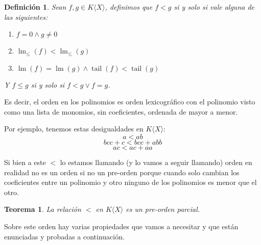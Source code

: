 \documentclass{report}
\theoremstyle{customstyle}
\newtheorem{definition}{Definición}[chapter]
\newtheorem{theorem}{Teorema}[chapter]
\theoremstyle{factstyle}
\DeclareMathOperator{\lm}{lm}
\DeclareMathOperator{\tail}{tail}
\begin{document}
\begin{definition}
  Sean $f, g ∈  K⟨X⟩$, definimos que $f < g$ si y solo si vale alguna de las siguientes:
  \begin{enumerate}
    \item $f = 0 ∧ g ≠ 0$
    \item $\lm_≤(f) < \lm_≤(g)$
    \item $\lm(f) = \lm(g) ∧ \tail(f) < \tail(g)$
  \end{enumerate}
  Y $f ≤ g$ si y solo si $f < g ∨ f = g$.
\end{definition}

Es decir, el orden en los polinomios es orden lexicográfico con el polinomio visto como una lista de monomios, sin coeficientes, ordenada de mayor a menor.

Por ejemplo, tenemos estas desigualdades en $K⟨X⟩$:
\[ a < ab \]
\[ bcc + c < bcc + abb \]
\[ ac < ac + aa \]

Si bien a este $<$ lo estamos llamando (y lo vamos a seguir llamando) orden en realidad no es un orden si no un pre-orden porque cuando solo cambian los coeficientes entre un polinomio y otro ninguno de los polinomios es menor que el otro.

\begin{theorem}
  La relación $<$ en $K⟨X⟩$ es un pre-orden parcial.
\end{theorem}

Sobre este orden hay varias propiedades que vamos a necesitar y que están enunciadas y probadas a continuación.
\end{document}
